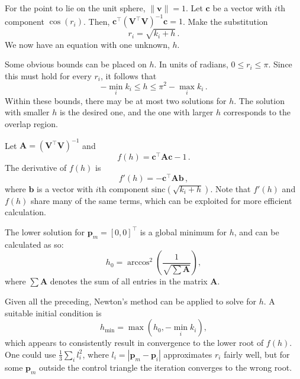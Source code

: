 \documentclass[]{interact}
\begin{document}
For the point to lie on the unit sphere, $\|\mathbf v\| = 1$. Let $\mathbf c$
be a vector with $i$th component $\cos\left(r_i \right)$. Then,
$\mathbf c^\top \left(\mathbf V^\top \mathbf V\right )^{-1} \mathbf c = 1$.
Make the substitution
\begin{equation}\label{eq:inverser}
  r_i = \sqrt{k_i + h} \,.
\end{equation} We now have an equation with one unknown, $h$.

Some obvious bounds can be placed on $h$. In units of radians,
$0 \le r_i \le \pi$. Since this must hold for every $r_i$, it follows that
\begin{equation}
   -\min_i k_i \le h \le \pi^2 - \max_i k_i \,.
\end{equation}
Within these bounds, there may be at most two solutions for $h$. The solution
with smaller $h$ is the desired one, and the one with larger $h$ corresponds to
the overlap region.

Let $\mathbf A = \left(\mathbf V^\top \mathbf V\right )^{-1}$ and
\begin{equation}\label{eq:inversefh}
f(h) = \mathbf c^\top \mathbf A \mathbf c - 1 \,.
\end{equation}
The derivative of $f(h)$ is
\begin{equation}\label{eq:inversefph}
  f'(h) = -\mathbf c^\top \mathbf A \mathbf b \,,
\end{equation}
where $\mathbf b$ is a vector with $i$th component
$\mathrm{sinc}\left(\sqrt{k_i + h}\right)$.
Note that $f'(h)$ and $f(h)$ share many of the same terms,
which can be exploited for more efficient calculation.

The lower solution for $\mathbf p_m = [0, 0]^\top$ is a
global minimum for $h$, and can be calculated as so:
\begin{equation}
  h_0 = \arccos^2 \left(\frac{1}{\sqrt{\sum \mathbf A }} \right) ,
\end{equation}
where $\sum \mathbf A$ denotes the sum of all entries in the matrix $\mathbf A$.

Given all the preceding, Newton's method can be applied to solve for $h$.
A suitable initial condition is
\begin{equation}\label{eq:inverseh}
  h_{\min} = \max \left(h_0, -\min_i k_i \right),
\end{equation}
which appears to consistently result in convergence to the lower root of $f(h)$.
One could use $\frac{1}{3}\sum_i l^2_i$,
where $l_i = |\mathbf p_m - \mathbf p_i|$ approximates $r_i$ fairly well,
but for some $\mathbf p_m$ outside the control triangle the iteration
converges to the wrong root.
\end{document}
